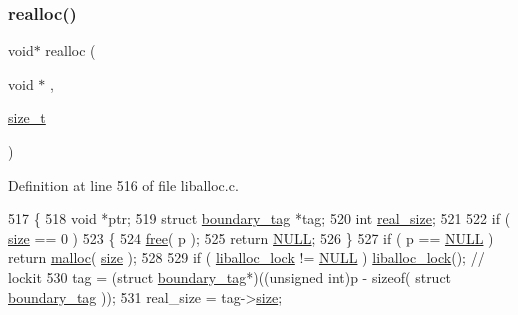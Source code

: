 \subsubsection{\texorpdfstring{realloc()}{realloc()}}
{\footnotesize\ttfamily void$\ast$ realloc (\begin{DoxyParamCaption}\item[{void $\ast$}]{,  }\item[{\hyperlink{a00038_a7c94ea6f8948649f8d181ae55911eeaf_a7c94ea6f8948649f8d181ae55911eeaf}{size\+\_\+t}}]{ }\end{DoxyParamCaption})}



Definition at line 516 of file liballoc.\+c.


\begin{DoxyCode}
517 \{
518     \textcolor{keywordtype}{void} *ptr;
519     \textcolor{keyword}{struct }\hyperlink{a00126}{boundary\_tag} *tag;
520     \textcolor{keywordtype}{int} \hyperlink{a00126_ad22b1c69bdce419783ac165f7f354245_ad22b1c69bdce419783ac165f7f354245}{real\_size};
521     
522     \textcolor{keywordflow}{if} ( \hyperlink{a00126_a29b056a39f6022d32468e7913e6df936_a29b056a39f6022d32468e7913e6df936}{size} == 0 )
523     \{
524         \hyperlink{a00035_afbedc913aa4651b3c3b4b3aecd9b4711_afbedc913aa4651b3c3b4b3aecd9b4711}{free}( p );
525         \textcolor{keywordflow}{return} \hyperlink{a00038_a070d2ce7b6bb7e5c05602aa8c308d0c4_a070d2ce7b6bb7e5c05602aa8c308d0c4}{NULL};
526     \}
527     \textcolor{keywordflow}{if} ( p == \hyperlink{a00038_a070d2ce7b6bb7e5c05602aa8c308d0c4_a070d2ce7b6bb7e5c05602aa8c308d0c4}{NULL} ) \textcolor{keywordflow}{return} \hyperlink{a00035_a7ac38fce3243a7dcf448301ee9ffd392_a7ac38fce3243a7dcf448301ee9ffd392}{malloc}( \hyperlink{a00126_a29b056a39f6022d32468e7913e6df936_a29b056a39f6022d32468e7913e6df936}{size} );
528 
529     \textcolor{keywordflow}{if} ( \hyperlink{a00038_a8b5670e4594b0b6f8be78fe17f0c3b53_a8b5670e4594b0b6f8be78fe17f0c3b53}{liballoc\_lock} != \hyperlink{a00038_a070d2ce7b6bb7e5c05602aa8c308d0c4_a070d2ce7b6bb7e5c05602aa8c308d0c4}{NULL} ) \hyperlink{a00038_a8b5670e4594b0b6f8be78fe17f0c3b53_a8b5670e4594b0b6f8be78fe17f0c3b53}{liballoc\_lock}();     \textcolor{comment}{// lockit}
530         tag = (\textcolor{keyword}{struct }\hyperlink{a00126}{boundary\_tag}*)((\textcolor{keywordtype}{unsigned} \textcolor{keywordtype}{int})p - \textcolor{keyword}{sizeof}( \textcolor{keyword}{struct }
      \hyperlink{a00126}{boundary\_tag} ));
531         real\_size = tag->\hyperlink{a00126_a29b056a39f6022d32468e7913e6df936_a29b056a39f6022d32468e7913e6df936}{size};

\end{DoxyCode}
